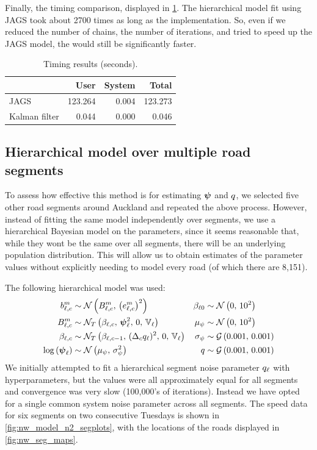 Finally, the timing comparison, displayed in \cref{tab:nw_model_n1_timecomp}. The hierarchical model fit using JAGS took about 2700 times as long as the \kf{} implementation. So, even if we reduced the number of chains, the number of iterations, and tried to speed up the JAGS model, the \kf{} would still be significantly faster.


\begin{table}

\caption{\label{tab:nw_model_n1_timecomp}Timing results (seconds).}
\centering
\begin{tabular}[b]{lrrr}
\toprule
  & User & System & Total\\
\midrule
JAGS & 123.264 & 0.004 & 123.273\\
Kalman filter & 0.044 & 0.000 & 0.046\\
\bottomrule
\end{tabular}
\end{table}




\subsection{Hierarchical model over multiple road segments}
\label{sec:nw_par_est_multiple}



To assess how effective this method is for estimating $\mathbf{\boldsymbol{\psi}}$ and $q$, we selected five other road segments around Auckland and repeated the above process. However, instead of fitting the same model independently over segments,  we use a hierarchical Bayesian model on the parameters, since it seems reasonable that, while they wont be the same over all segments, there will be an underlying population distribution. This will allow us to obtain estimates of the parameter values without explicitly needing to model every road (of which there are 8,151).


The following hierarchical model was used:
\begin{align*}
\label{eq:tt_hist_hier}
b_{\ell,c}^m &\sim \mathcal{N}\left(B_{\ell,c}^m,\, \left(e_{\ell,c}^m\right)^2\right) &
\beta_{\ell0} &\sim \mathcal{N}\left(0,\, 10^2\right) \\
B_{\ell,c}^m &\sim \mathcal{N}_T\left(\beta_{\ell,c},\, \mathbf{\boldsymbol{\psi}}_{\ell}^2,\, 0,\, \mathbb{V}_\ell\right) &
\mu_\psi &\sim \mathcal{N}\left(0,\, 10^2\right) \\
\beta_{\ell,c} &\sim \mathcal{N}_T\left(\beta_{\ell,c-1},\, (\Delta_c q_{\ell})^2,\, 0,\, \mathbb{V}_\ell\right) &
\sigma_\psi &\sim \mathcal{G}\left(0.001,\, 0.001\right) \\
\log\left(\mathbf{\boldsymbol{\psi}}_{\ell}\right) &\sim \mathcal{N}\left(\mu_\psi,\, \sigma_\psi^2\right) &
q &\sim \mathcal{G}\left(0.001,\, 0.001\right)
\end{align*}
We initially attempted to fit a hierarchical segment noise parameter $q_{\ell}$ with hyperparameters, but the values were all approximately equal for all segments and convergence was very slow (100,000's of iterations). Instead we have opted for a single common system noise parameter across all segments. The speed data for six segments on two consecutive Tuesdays is shown in \cref{fig:nw_model_n2_segplots}, with the locations of the roads displayed in \cref{fig:nw_seg_maps}.

